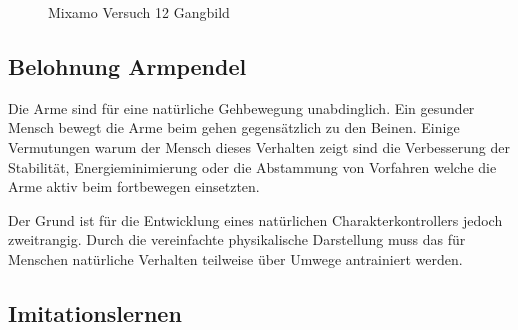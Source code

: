 \begin{figure}[H]
\begin{tabular}{ccc}
  \end{tabular}
  \caption{Mixamo Versuch 12 Gangbild}
  \label{fig:mixamo_versuch12_gangbild}
\end{figure}

\subsection{Belohnung Armpendel}
Die Arme sind für eine natürliche Gehbewegung unabdinglich. Ein gesunder Mensch bewegt die Arme beim gehen gegensätzlich zu den Beinen. Einige Vermutungen warum der Mensch dieses Verhalten zeigt sind die Verbesserung der Stabilität, Energieminimierung oder die Abstammung von Vorfahren welche die Arme aktiv beim fortbewegen einsetzten.\cite{meyns2013and}

Der Grund ist für die Entwicklung eines natürlichen Charakterkontrollers jedoch zweitrangig. Durch die vereinfachte physikalische Darstellung muss das für Menschen natürliche Verhalten teilweise über Umwege antrainiert werden.

\subsection{Imitationslernen}